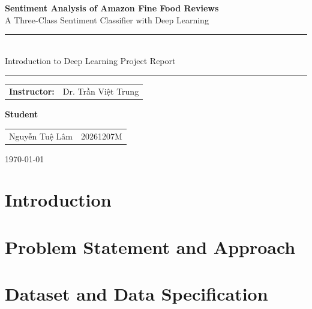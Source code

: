 \documentclass[a4paper,11pt]{report}
\begin{document}
\begin{titlepage}
    \centering
    \vspace*{3cm}

    {\LARGE\bfseries Sentiment Analysis of Amazon Fine Food Reviews}\\[0.4cm]
    {\Large A Three-Class Sentiment Classifier with Deep Learning}\\[2cm]

    \rule{0.8\linewidth}{0.6pt}\\[0.5cm]
    {\large Introduction to Deep Learning Project Report}\\[0.2cm]
    \rule{0.8\linewidth}{0.6pt}

    \vfill

    \begin{tabular}{ll}
        \textbf{Instructor:} & Dr. Trần Việt Trung \\
    \end{tabular}

    \vspace{0.8cm}

    \textbf{Student}\\[0.3cm]
    \begin{tabular}{ll}
        Nguyễn Tuệ Lâm & 20261207M \\
    \end{tabular}

    \vspace{1cm}
    {\large \today}

    \vspace*{1cm}
\end{titlepage}

\tableofcontents

\chapter{Introduction}
\label{ch:introduction}


\chapter{Problem Statement and Approach}
\label{ch:problem-approach}


\chapter{Dataset and Data Specification}
\label{ch:dataset}

\end{document}

